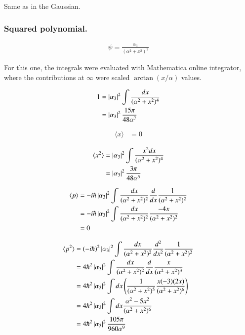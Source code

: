 \documentclass{article}
\newcommand{\expectation}[1]{\langle{#1}\rangle}
\begin{document}
Same as in the Gaussian.

\subsubsection{ Squared polynomial. }

\begin{align*}
\psi = \frac{\alpha_3}{(\alpha^2 + x^2)^2}
\end{align*}

For this one, the integrals were evaluated with Mathematica online integrator, where the contributions at $\infty$ were scaled $\arctan(x/\alpha)$ values.

\begin{align*}
1 
&= \left\lvert{\alpha_3}\right\rvert^2 \int \frac{dx}{(\alpha^2 + x^2)^4} \\
&= \left\lvert{\alpha_3}\right\rvert^2 \frac{15 \pi}{48 \alpha^7}
\end{align*}

\begin{align*}
\expectation{x} &= 0
\end{align*}

\begin{align*}
\expectation{x^2} 
&= \Abs{\alpha_3}^2 \int \frac{x^2 dx}{(\alpha^2 + x^2)^4} \\
&= \Abs{\alpha_3}^2 \frac{3 \pi}{48 \alpha^5}
\end{align*}

\begin{align*}
\expectation{p} 
&= -i \hbar \Abs{\alpha_3}^2 \int \frac{dx}{(\alpha^2 + x^2)^2} \frac{d}{dx} \frac{1}{(\alpha^2 + x^2)^2}  \\
&= -i \hbar \Abs{\alpha_3}^2 \int \frac{dx}{(\alpha^2 + x^2)^2} \frac{-4x}{(\alpha^2 + x^2)^2} \\
&= 0
\end{align*}

\begin{align*}
\expectation{p^2} 
&= (-i \hbar)^2 \Abs{\alpha_3}^2 \int \frac{dx}{(\alpha^2 + x^2)^2} \frac{d^2}{dx^2} \frac{1}{(\alpha^2 + x^2)^2}  \\
&= 4 \hbar^2 \Abs{\alpha_3}^2 \int \frac{dx}{(\alpha^2 + x^2)^2} \frac{d}{dx} \frac{x}{(\alpha^2 + x^2)^3} \\
&= 4 \hbar^2 \Abs{\alpha_3}^2 \int dx
\left( \frac{1}{(\alpha^2 + x^2)^5} \frac{x(-3)(2x)}{(\alpha^2 + x^2)^6} \right)
\\
&= 4 \hbar^2 \Abs{\alpha_3}^2 \int dx \frac{\alpha^2 - 5x^2}{(\alpha^2 + x^2)^6} 
\\
&= 4 \hbar^2 \Abs{\alpha_3}^2 \frac{105 \pi}{960 \alpha^9}
\\
\end{align*}
\end{document}
